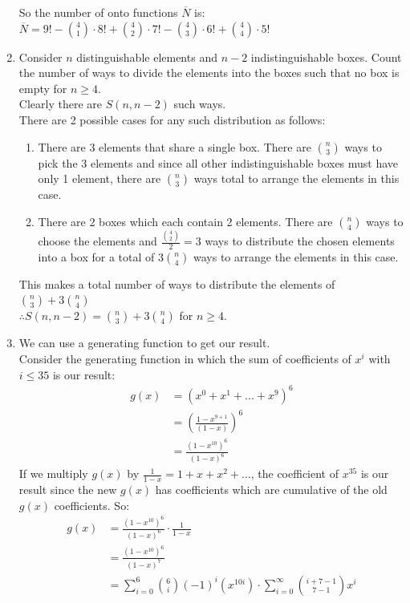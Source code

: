 \documentclass[11pt]{article}
\begin{document}
\begin{enumerate}[]
So the number of onto functions $\overline{N}$ is:\\
$\overline{N}= 9! -\binom{4}{1}\cdot 8! + \binom{4}{2}\cdot 7! -\binom{4}{3}\cdot 6! + \binom{4}{4}\cdot 5!$
\item
Consider $n$ distinguishable elements and $n-2$ indistinguishable boxes. Count the number of ways to divide the elements into the boxes such that no box is empty for $n\geq 4$.\\
Clearly there are $S(n,n-2)$ such ways.\\
There are 2 possible cases for any such distribution as follows:
	\begin{enumerate}
	\item There are 3 elements that share a single box. There are $\binom{n}{3}$ ways to pick the 3 elements and since all other indistinguishable boxes must have only 1 element, there are $\binom{n}{3}$ ways total to arrange the elements in this case.
	\item There are 2 boxes which each contain 2 elements. There are $\binom{n}{4}$ ways to choose the elements and $\frac{\binom{4}{2}}{2} = 3$ ways to distribute the chosen elements into a box for a total of $3\binom{n}{4}$ ways to arrange the elements in this case.
	\end{enumerate}
This makes a total number of ways to distribute the elements of $\binom{n}{3}+3\binom{n}{4}$\\
$\therefore S(n,n-2)=\binom{n}{3}+3\binom{n}{4}$ for $n\geq 4$.
\item
We can use a generating function to get our result.\\
Consider the generating function in which the sum of coefficients of $x^i$ with $i\leq 35$ is our result:
	\begin{align}
		g(x)&=(x^0+x^1+...+x^9)^6 \nonumber\\
		&=(\frac{1-x^{9+1}}{(1-x)})^6 \nonumber\\
		&=\frac{(1-x^{10})^6}{(1-x)^6} \nonumber
	\end{align}
If we multiply $g(x)$ by $\frac{1}{1-x}=1+x+x^2+...$, the coefficient of $x^{35}$ is our result since the new $g(x)$ has coefficients which are cumulative of the old $g(x)$ coefficients. So:
	\begin{align}
		g(x)&=\frac{(1-x^{10})^6}{(1-x)^6}\cdot \frac{1}{1-x} \nonumber\\
		&=\frac{(1-x^{10})^6}{(1-x)^7} \nonumber\\
		&=\sum_{i=0}^{6} \binom{6}{i}(-1)^i(x^{10i}) \cdot \sum_{i=0}^{\infty} \binom{i+7-1}{7-1}x^i  \nonumber\\

\end{align}
\end{enumerate}
\end{document}
